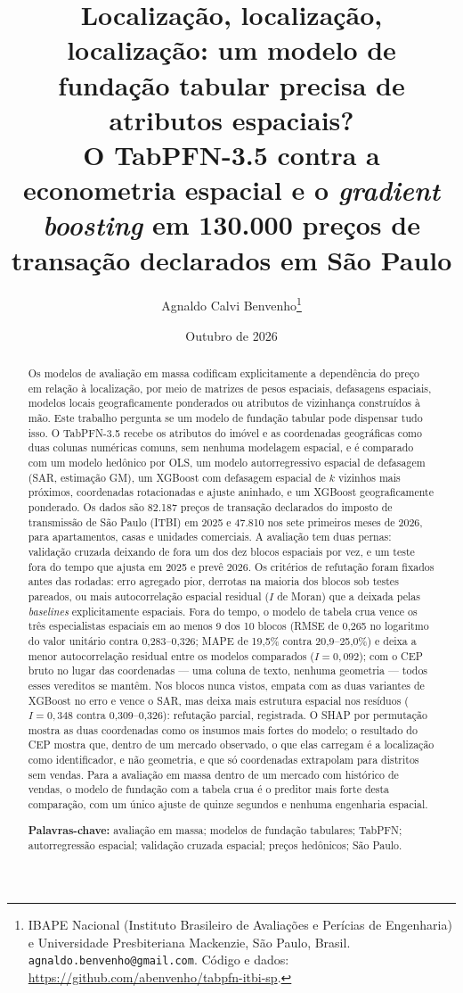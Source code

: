 \documentclass[11pt,a4paper]{article}
\title{Localização, localização, localização: um modelo de fundação tabular precisa de
atributos espaciais?\\
\large O TabPFN-3.5 contra a econometria espacial e o \emph{gradient boosting} em 130.000
preços de transação declarados em São Paulo}
\author{Agnaldo Calvi Benvenho\thanks{IBAPE Nacional (Instituto Brasileiro de Avaliações e
Perícias de Engenharia) e Universidade Presbiteriana Mackenzie, São Paulo, Brasil.
\texttt{agnaldo.benvenho@gmail.com}. Código e dados:
\url{https://github.com/abenvenho/tabpfn-itbi-sp}.}}
\date{Outubro de 2026}
\begin{document}
\maketitle

\begin{abstract}
\noindent Os modelos de avaliação em massa codificam explicitamente a
dependência do preço em relação à localização, por meio de matrizes de pesos espaciais,
defasagens espaciais, modelos locais geograficamente ponderados ou atributos de vizinhança
construídos à mão. Este trabalho pergunta se um modelo de fundação tabular pode dispensar tudo
isso. O TabPFN-3.5 recebe os atributos do imóvel e as coordenadas geográficas como duas colunas
numéricas comuns, sem nenhuma modelagem espacial, e é comparado com um modelo hedônico por
OLS, um modelo autorregressivo espacial de defasagem (SAR, estimação GM), um XGBoost com
defasagem espacial de $k$ vizinhos mais próximos, coordenadas rotacionadas e ajuste aninhado, e
um XGBoost geograficamente ponderado. Os dados são 82.187 preços de transação declarados do
imposto de transmissão de São Paulo (ITBI) em 2025 e 47.810 nos sete primeiros meses de 2026,
para apartamentos, casas e unidades comerciais. A avaliação tem duas pernas: validação cruzada
deixando de fora um dos dez blocos espaciais por vez, e um teste fora do tempo que ajusta em
2025 e prevê 2026. Os critérios de refutação foram fixados antes das rodadas: erro agregado
pior, derrotas na maioria dos blocos sob testes pareados, ou mais autocorrelação espacial
residual ($I$ de Moran) que a deixada pelas \emph{baselines} explicitamente espaciais. Fora do
tempo, o modelo de tabela crua vence os três especialistas espaciais em ao menos 9 dos 10
blocos (RMSE de 0,265 no logaritmo do valor unitário contra 0,283--0,326; MAPE de 19,5\%
contra 20,9--25,0\%) e deixa a menor autocorrelação residual entre os modelos comparados
($I = 0{,}092$); com o CEP bruto no lugar das coordenadas --- uma coluna de texto, nenhuma
geometria --- todos esses vereditos se mantêm. Nos blocos nunca vistos, empata com as duas
variantes de XGBoost no erro e vence o SAR, mas deixa mais estrutura espacial nos resíduos
($I = 0{,}348$ contra 0,309--0,326): refutação parcial, registrada. O SHAP por permutação
mostra as duas coordenadas como os insumos mais fortes do modelo; o resultado do CEP mostra
que, dentro de um mercado observado, o que elas carregam é a localização como identificador, e
não geometria, e que só coordenadas extrapolam para distritos sem vendas. Para a avaliação em
massa dentro de um mercado com histórico de vendas, o modelo de fundação com a tabela crua é o
preditor mais forte desta comparação, com um único ajuste de quinze segundos e nenhuma
engenharia espacial.

\medskip
\noindent\textbf{Palavras-chave:} avaliação em massa; modelos de fundação tabulares; TabPFN;
autorregressão espacial; validação cruzada espacial; preços hedônicos; São Paulo.
\end{abstract}
\end{document}
